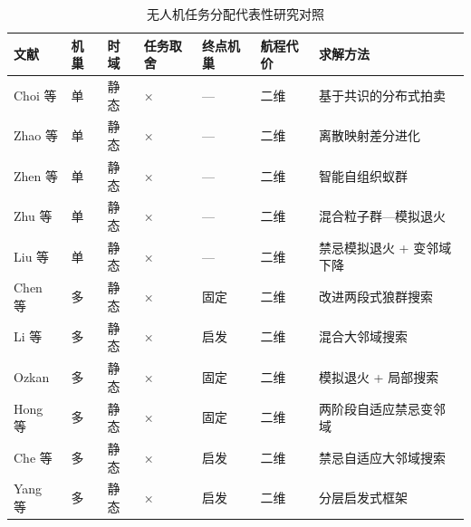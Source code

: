 \begin{table}[!htb]   %
    \centering
    \setlength{\tabcolsep}{4pt}   %
    \caption{无人机任务分配代表性研究对照}\label{tab:lit_compare}
    \begin{tabular}{%
            p{2.7cm}%
            >{\centering\arraybackslash}p{0.75cm}%
            >{\centering\arraybackslash}p{1.0cm}%
            >{\centering\arraybackslash}p{1.4cm}%
            >{\centering\arraybackslash}p{1.4cm}%
            >{\centering\arraybackslash}p{1.4cm}%
            >{\raggedright\arraybackslash}p{5.9cm}}
        \toprule
        文献                                      & 机巢 & 时域 & 任务取舍       & 终点机巢 & 航程代价 & 求解方法              \\
        \midrule
        Choi 等\cite{choi2009cbaa}               & 单  & 静态 & ×          & —    & 二维   & 基于共识的分布式拍卖        \\
        Zhao 等\cite{zhao2017dmde}               & 单  & 静态 & ×          & —    & 二维   & 离散映射差分进化          \\
        Zhen 等\cite{zhen2018searchattack}       & 单  & 静态 & ×          & —    & 二维   & 智能自组织蚁群           \\
        Zhu 等\cite{zhu2019postquake}            & 单  & 静态 & ×          & —    & 二维   & 混合粒子群—模拟退火        \\
        Liu 等\cite{liu2021twophase}             & 单  & 静态 & ×          & —    & 二维   & 禁忌模拟退火 + 变邻域下降    \\
        \addlinespace
        Chen 等\cite{chen2018mtwps}              & 多  & 静态 & ×          & 固定   & 二维   & 改进两段式狼群搜索         \\
        Li 等\cite{li2021mdusr}                  & 多  & 静态 & ×          & 启发   & 二维   & 混合大邻域搜索           \\
        Ozkan\cite{ozkan2021multibase}          & 多  & 静态 & ×          & 固定   & 二维   & 模拟退火 + 局部搜索       \\
        Hong 等\cite{hong2023logistics}          & 多  & 静态 & ×          & 固定   & 二维   & 两阶段自适应禁忌变邻域       \\
        Che 等\cite{che2022mdalns}               & 多  & 静态 & ×          & 启发   & 二维   & 禁忌自适应大邻域搜索        \\
        Yang 等\cite{yang2024mdtsp}              & 多  & 静态 & ×          & 启发   & 二维   & 分层启发式框架           \\

\end{tabular}
\end{table}
